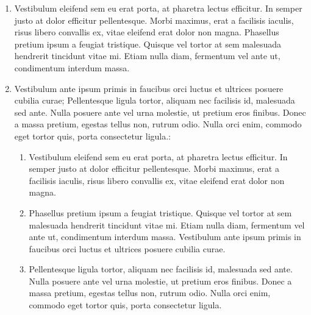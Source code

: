 \begin{enumerate}
	\item Vestibulum eleifend sem eu erat porta, at pharetra lectus efficitur. In semper justo at dolor efficitur pellentesque. Morbi maximus, erat a facilisis iaculis, risus libero convallis ex, vitae eleifend erat dolor non magna. Phasellus pretium ipsum a feugiat tristique. Quisque vel tortor at sem malesuada hendrerit tincidunt vitae mi. Etiam nulla diam, fermentum vel ante ut, condimentum interdum massa.
	\item Vestibulum ante ipsum primis in faucibus orci luctus et ultrices posuere cubilia curae; Pellentesque ligula tortor, aliquam nec facilisis id, malesuada sed ante. Nulla posuere ante vel urna molestie, ut pretium eros finibus. Donec a massa pretium, egestas tellus non, rutrum odio. Nulla orci enim, commodo eget tortor quis, porta consectetur ligula.:
	
		\begin{enumerate}
			\item Vestibulum eleifend sem eu erat porta, at pharetra lectus efficitur. In semper justo at dolor efficitur pellentesque. Morbi maximus, erat a facilisis iaculis, risus libero convallis ex, vitae eleifend erat dolor non magna. 
			\item Phasellus pretium ipsum a feugiat tristique. Quisque vel tortor at sem malesuada hendrerit tincidunt vitae mi. Etiam nulla diam, fermentum vel ante ut, condimentum interdum massa. Vestibulum ante ipsum primis in faucibus orci luctus et ultrices posuere cubilia curae.
			\item Pellentesque ligula tortor, aliquam nec facilisis id, malesuada sed ante. Nulla posuere ante vel urna molestie, ut pretium eros finibus. Donec a massa pretium, egestas tellus non, rutrum odio. Nulla orci enim, commodo eget tortor quis, porta consectetur ligula.
		\end{enumerate}
	

\end{enumerate}
